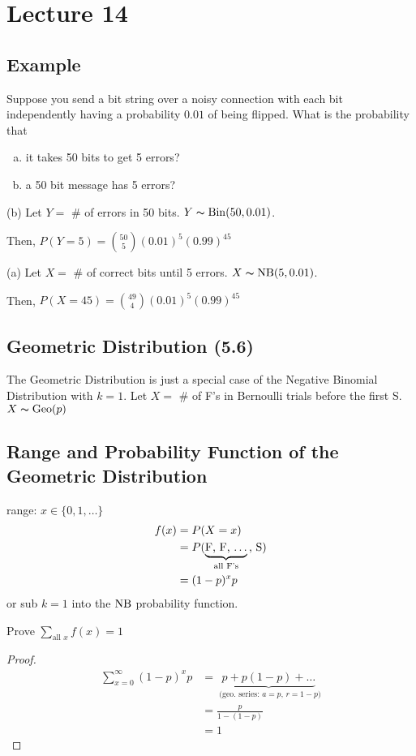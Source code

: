 \section{Lecture 14}

\subsection{Example}
Suppose you send a bit string over a noisy connection with
each bit independently having a probability $ 0.01 $ of being
flipped. What is the probability that
\begin{enumerate}[(a)]
    \item it takes 50 bits to get 5 errors?
    \item a 50 bit message has 5 errors?
\end{enumerate}

(b) Let $ Y= $ \# of errors in 50 bits. $ Y\thicksim\operatorname{Bin}(50,0.01) $.

Then, $ P(Y=5)=\binom{50}{5}(0.01)^5(0.99)^{45} $

(a) Let $ X= $ \# of correct bits until 5 errors.
$ X\thicksim\operatorname{NB}(5,0.01) $. 

Then, $ P(X=45)=\binom{49}{4}(0.01)^5(0.99)^{45} $ 

\subsection{Geometric Distribution (5.6)}
The Geometric Distribution is just a special case of the
Negative Binomial Distribution with $ k=1 $.
Let $ X= $ \# of F's in Bernoulli trials before the first S.
$ X\thicksim\operatorname{Geo}(p) $

\subsection{Range and Probability Function of the Geometric Distribution}
range: $ x\in\{0,1,\ldots \} $ 
\begin{align*}
    f(x)&=P(X=x)\\
    &=P( \underbrace{\text{F, F, $ \ldots $}}_{\text{all F's}}
    \text{, S})\\
    &=(1-p)^x p
\end{align*}
or sub $ k=1 $ into the $ \operatorname{NB} $ probability function.

Prove $ \sum\limits_{\text{all } x}^{} f(x) =1$
\begin{proof}
    \begin{align*}
        \sum\limits_{x=0}^{\infty} (1-p)^x p
        &=\underbrace{p+p(1-p)+\dots}_
        \text{ (geo. series: $a=p$, $r=1-p$)}\\
        &=\frac{p}{1-(1-p)}\\
        &=1
    \end{align*}
\end{proof}

